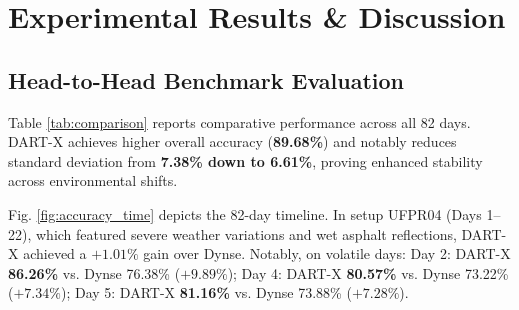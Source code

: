 \documentclass[conference,10pt]{IEEEtran}
\begin{document}
\section{Experimental Results \& Discussion}
\label{sec:results}

\begin{table}[t]
\caption{Comparative Performance Summary (82 Days, 619,466 Instances)}
\label{tab:comparison}
\centering
{}
\end{table}

\subsection{Head-to-Head Benchmark Evaluation}
Table \ref{tab:comparison} reports comparative performance across all 82 days. DART-X achieves higher overall accuracy (\textbf{89.68\%}) and notably reduces standard deviation from \textbf{7.38\% down to 6.61\%}, proving enhanced stability across environmental shifts.

Fig. \ref{fig:accuracy_time} depicts the 82-day timeline. In setup UFPR04 (Days 1--22), which featured severe weather variations and wet asphalt reflections, DART-X achieved a $+1.01\%$ gain over Dynse. Notably, on volatile days: Day 2: DART-X \textbf{86.26\%} vs. Dynse 76.38\% ($+9.89\%$); Day 4: DART-X \textbf{80.57\%} vs. Dynse 73.22\% ($+7.34\%$); Day 5: DART-X \textbf{81.16\%} vs. Dynse 73.88\% ($+7.28\%$).
\end{document}
